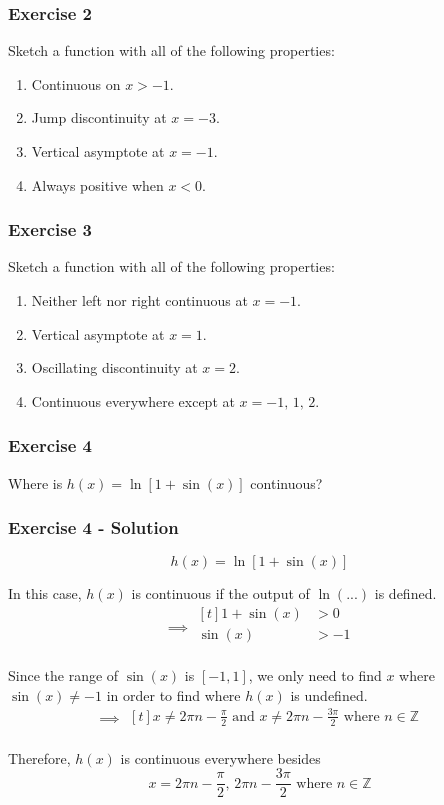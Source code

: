 \documentclass[12pt]{beamer}
\begin{document}
\begin{frame}
	\frametitle{Exercise 2}
	\vfill
	\vfill
	\vfill
	\vfill
	Sketch a function with all of the following properties:\par
	\vfill
	\begin{enumerate}\itemsep2ex
		\item Continuous on $x > -1$.
		\item Jump discontinuity at $x = -3$.
		\item Vertical asymptote at $x = -1$.
		\item Always positive when $x < 0$.
	\end{enumerate}
	\vfill
	\vfill
	\vfill
	\vfill
	\vfill
\end{frame}
\begin{frame}
	\frametitle{Exercise 3}
	\vfill
	\vfill
	\vfill
	\vfill
	Sketch a function with all of the following properties:\par
	\vfill
	\begin{enumerate}\itemsep2ex
		\item Neither left nor right continuous at $x = -1$.
		\item Vertical asymptote at $x = 1$.
		\item Oscillating discontinuity at $x = 2$.
		\item Continuous everywhere except at $x = -1\text{, } 1\text{, } 2$.
	\end{enumerate}
	\vfill
	\vfill
	\vfill
	\vfill
	\vfill
\end{frame}
\begin{frame}
	\frametitle{Exercise 4}
	\Large
	Where is $h(x) = \ln[1+\sin(x)]$ continuous?
\end{frame}
\begin{frame}
	\frametitle{Exercise 4 - Solution}

	\large
	\[h(x) = \ln[1+\sin(x)]\]\par
	\vfill
	\small
	In this case, $h(x)$ is continuous if the output of $\ln(...)$ is defined.
	\[
		\implies\begin{aligned}[t]
			1+\sin(x) & > 0  \\
			\sin(x)   & > -1 \\
		\end{aligned}
	\]\par
	Since the range of $\sin(x)$ is $[-1, 1]$, we only need to find $x$ where $\sin(x)\neq-1$ in order to find where $h(x)$ is undefined.
	\[
		\implies\begin{aligned}[t]
			x \neq 2\pi n - \frac{\pi}{2} \text{ and } x \neq 2\pi n - \frac{3\pi}{2} \text{ where } n\in \mathbb{Z} \\
		\end{aligned}
	\]\par
	Therefore, $h(x)$ is continuous everywhere besides \[x = 2\pi n - \frac{\pi}{2} \text{, } 2\pi n - \frac{3\pi}{2} \text{ where } n\in \mathbb{Z}\]
\end{frame}
\end{document}
